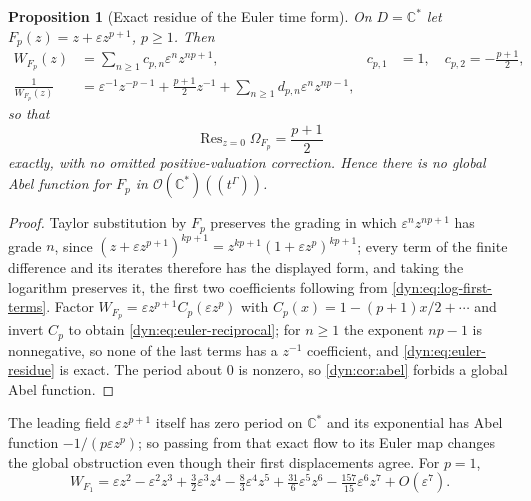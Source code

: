 \documentclass[11pt,letterpaper]{article}
\newtheorem{proposition}[proposition]{Proposition}
\theoremstyle{definition}
\theoremstyle{remark}
\newcommand{\C}{\mathbb C}
\newcommand{\OO}{\mathcal O}
\newcommand{\Res}{\operatorname{Res}}
\newcommand{\eps}{\varepsilon}
\numberwithin{equation}{section}
\begin{document}
\begin{proposition}[Exact residue of the Euler time form]
\label{dyn:prop:euler-residue}
On $D=\C^{*}$ let $F_p(z)=z+\eps z^{p+1}$, $p\ge1$. Then
\begin{align}
 W_{F_p}(z)&=\sum_{n\ge1}c_{p,n}\eps^{n}z^{np+1},
 & c_{p,1}&=1,\quad c_{p,2}=-\frac{p+1}{2},\label{dyn:eq:euler-grading}\\
 \frac1{W_{F_p}(z)}&=\eps^{-1}z^{-p-1}+\frac{p+1}{2}z^{-1}
 +\sum_{n\ge1}d_{p,n}\eps^{n}z^{np-1},\label{dyn:eq:euler-reciprocal}
\end{align}
so that
\begin{equation}\label{dyn:eq:euler-residue}
 \Res_{z=0}\Omega_{F_p}=\frac{p+1}{2}
\end{equation}
\emph{exactly}, with no omitted positive-valuation correction. Hence there
is no global Abel function for $F_p$ in $\OO(\C^{*})((t^{\Gamma}))$.
\end{proposition}
\begin{proof}
Taylor substitution by $F_p$ preserves the grading in which
$\eps^{n}z^{np+1}$ has grade $n$, since
$(z+\eps z^{p+1})^{kp+1}=z^{kp+1}(1+\eps z^{p})^{kp+1}$; every term of the
finite difference and its iterates therefore has the displayed form, and
taking the logarithm preserves it, the first two coefficients following
from \eqref{dyn:eq:log-first-terms}. Factor
$W_{F_p}=\eps z^{p+1}C_p(\eps z^{p})$ with
$C_p(x)=1-(p+1)x/2+\cdots$ and invert $C_p$ to obtain
\eqref{dyn:eq:euler-reciprocal}; for $n\ge1$ the exponent $np-1$ is
nonnegative, so none of the last terms has a $z^{-1}$ coefficient, and
\eqref{dyn:eq:euler-residue} is exact. The period about $0$ is nonzero, so
\cref{dyn:cor:abel} forbids a global Abel function.
\end{proof}

The leading field $\eps z^{p+1}$ itself has zero period on $\C^{*}$ and its
exponential has Abel function $-1/(p\eps z^{p})$; so passing from that
exact flow to its Euler map changes the global obstruction even though
their first displacements agree. For $p=1$,
\begin{equation}\label{dyn:eq:euler-known}
 W_{F_1}=\eps z^{2}-\eps^{2}z^{3}+\tfrac32\eps^{3}z^{4}
 -\tfrac83\eps^{4}z^{5}+\tfrac{31}6\eps^{5}z^{6}
 -\tfrac{157}{15}\eps^{6}z^{7}+O(\eps^{7}).
\end{equation}
\end{document}
